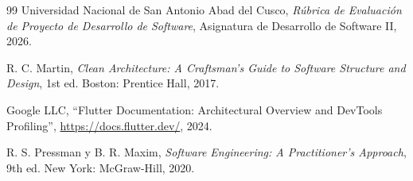 \documentclass[12pt,a4paper]{article}
\begin{document}
\begin{thebibliography}{99}
Universidad Nacional de San Antonio Abad del Cusco, \textit{Rúbrica de Evaluación de Proyecto de Desarrollo de Software}, Asignatura de Desarrollo de Software II, 2026.

R. C. Martin, \textit{Clean Architecture: A Craftsman's Guide to Software Structure and Design}, 1st ed. Boston: Prentice Hall, 2017.

Google LLC, ``Flutter Documentation: Architectural Overview and DevTools Profiling'', \url{https://docs.flutter.dev/}, 2024.

R. S. Pressman y B. R. Maxim, \textit{Software Engineering: A Practitioner's Approach}, 9th ed. New York: McGraw-Hill, 2020.
\end{thebibliography}
\end{document}
